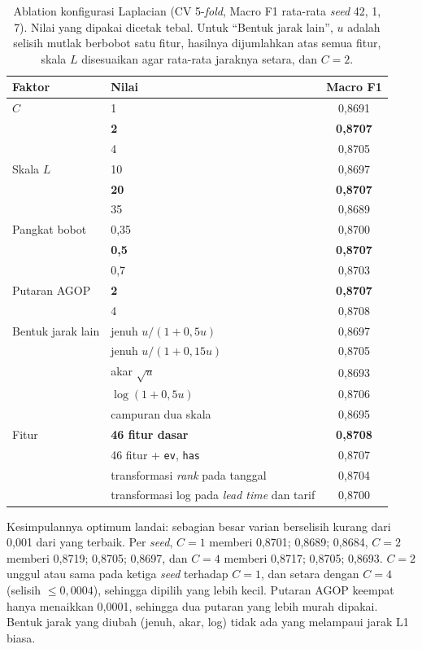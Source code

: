 \begin{table}[H]
	\centering
	\caption{Ablation konfigurasi Laplacian (CV 5-\textit{fold}, Macro F1 rata-rata \textit{seed} 42, 1, 7). Nilai yang dipakai dicetak tebal. Untuk ``Bentuk jarak lain'', $u$ adalah selisih mutlak berbobot satu fitur, hasilnya dijumlahkan atas semua fitur, skala $L$ disesuaikan agar rata-rata jaraknya setara, dan $C = 2$.}
	\label{tab:svm-ablasi}
	\small
	\begin{tabularx}{\textwidth}{l Y c}
		\toprule
		\textbf{Faktor} & \textbf{Nilai} & \textbf{Macro F1} \\
		\midrule
		$C$ & 1 & 0,8691 \\
		& \textbf{2} & \textbf{0,8707} \\
		& 4 & 0,8705 \\
		\midrule
		Skala $L$ & 10 & 0,8697 \\
		& \textbf{20} & \textbf{0,8707} \\
		& 35 & 0,8689 \\
		\midrule
		Pangkat bobot & 0,35 & 0,8700 \\
		& \textbf{0,5} & \textbf{0,8707} \\
		& 0,7 & 0,8703 \\
		\midrule
		Putaran AGOP & \textbf{2} & \textbf{0,8707} \\
		& 4 & 0,8708 \\
		\midrule
		Bentuk jarak lain & jenuh $u/(1 + 0{,}5u)$ & 0,8697 \\
		& jenuh $u/(1 + 0{,}15u)$ & 0,8705 \\
		& akar $\sqrt{u}$ & 0,8693 \\
		& $\log(1 + 0{,}5u)$ & 0,8706 \\
		& campuran dua skala & 0,8695 \\
		\midrule
		Fitur & \textbf{46 fitur dasar} & \textbf{0,8708} \\
		& 46 fitur + \texttt{ev}, \texttt{has} & 0,8707 \\
		& transformasi \textit{rank} pada tanggal & 0,8704 \\
		& transformasi log pada \textit{lead time} dan tarif & 0,8700 \\
		\bottomrule
	\end{tabularx}
\end{table}

Kesimpulannya optimum landai: sebagian besar varian berselisih kurang dari 0,001 dari yang terbaik. Per \textit{seed}, $C = 1$ memberi 0,8701; 0,8689; 0,8684, $C = 2$ memberi 0,8719; 0,8705; 0,8697, dan $C = 4$ memberi 0,8717; 0,8705; 0,8693. $C = 2$ unggul atau sama pada ketiga \textit{seed} terhadap $C = 1$, dan setara dengan $C = 4$ (selisih $\le 0{,}0004$), sehingga dipilih yang lebih kecil. Putaran AGOP keempat hanya menaikkan 0,0001, sehingga dua putaran yang lebih murah dipakai. Bentuk jarak yang diubah (jenuh, akar, log) tidak ada yang melampaui jarak L1 biasa.

